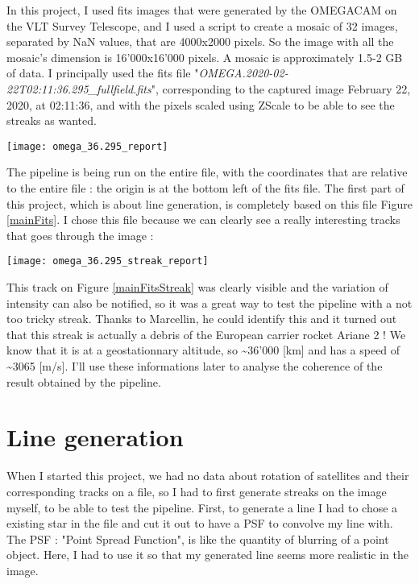 \documentclass[a4paper,12pt,oneside]{report}
\begin{document}
In this project, I used fits images that were generated by the OMEGACAM on the VLT Survey Telescope, and I used a script to create a 
mosaic of 32 images, separated by NaN values, that are 4000x2000 pixels. So the image with all the mosaic's dimension is 16'000x16'000 pixels. 
A mosaic is approximately 1.5-2 GB of data. 
\newline
I principally used the fits file "\emph{OMEGA.2020-02-22T02:11:36.295\_fullfield.fits}", corresponding to the
captured image February 22, 2020, at 02:11:36, and with the pixels scaled using ZScale to be able to see the streaks as wanted.
\newline
\begin{center}
    \texttt{[image: omega\_36.295\_report]}
    \label{mainFits}
\end{center}
The pipeline is being run on the entire file, with the coordinates that are relative to the entire file : the origin is at the bottom left of
the fits file. The first part of this project, which is about line generation, is completely based on this file Figure \ref{mainFits}. I chose
this file because we can clearly see a really interesting tracks that goes through the image :
\begin{center}
    \texttt{[image: omega\_36.295\_streak\_report]}
    \label{mainFitsStreak}
\end{center}
This track on Figure \ref{mainFitsStreak} was clearly visible and the variation of intensity can also be notified, so it was a great way to test the pipeline with a not
too tricky streak. Thanks to Marcellin, he could identify this and it turned out that this streak is actually a debris of the European 
carrier rocket Ariane 2 ! We know that it is at a geostationnary altitude, so \textasciitilde 36'000 [km] and has a speed of \textasciitilde 3065 [m/s]. I'll use these
informations later to analyse the coherence of the result obtained by the pipeline.

\chapter{Line generation}

When I started this project, we had no data about rotation of satellites and their corresponding tracks on a file, so I had to first 
generate streaks on the image myself, to be able to test the pipeline. First, to generate a line I had to chose a existing star in the file
and cut it out to have a PSF to convolve my line with. The PSF : "Point Spread Function", is like the quantity of blurring of a point object.
Here, I had to use it so that my generated line seems more realistic in the image. 
\end{document}
